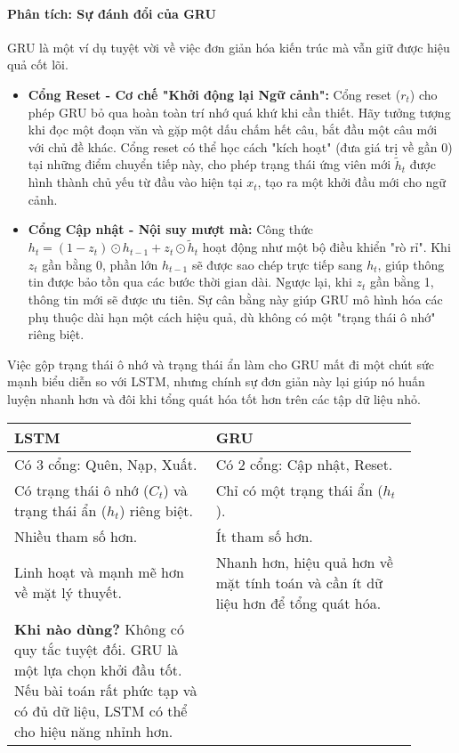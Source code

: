 \paragraph{Phân tích: Sự đánh đổi của GRU}
GRU là một ví dụ tuyệt vời về việc đơn giản hóa kiến trúc mà vẫn giữ được hiệu quả cốt lõi.
\begin{itemize}
    \item \textbf{Cổng Reset - Cơ chế "Khởi động lại Ngữ cảnh":} Cổng reset ($r_t$) cho phép GRU bỏ qua hoàn toàn trí nhớ quá khứ khi cần thiết. Hãy tưởng tượng khi đọc một đoạn văn và gặp một dấu chấm hết câu, bắt đầu một câu mới với chủ đề khác. Cổng reset có thể học cách "kích hoạt" (đưa giá trị về gần 0) tại những điểm chuyển tiếp này, cho phép trạng thái ứng viên mới $\tilde{h}_t$ được hình thành chủ yếu từ đầu vào hiện tại $x_t$, tạo ra một khởi đầu mới cho ngữ cảnh.
    
    \item \textbf{Cổng Cập nhật - Nội suy mượt mà:} Công thức $h_t = (1 - z_t) \odot h_{t-1} + z_t \odot \tilde{h}_t$ hoạt động như một bộ điều khiển "rò rỉ". Khi $z_t$ gần bằng 0, phần lớn $h_{t-1}$ sẽ được sao chép trực tiếp sang $h_t$, giúp thông tin được bảo tồn qua các bước thời gian dài. Ngược lại, khi $z_t$ gần bằng 1, thông tin mới sẽ được ưu tiên. Sự cân bằng này giúp GRU mô hình hóa các phụ thuộc dài hạn một cách hiệu quả, dù không có một "trạng thái ô nhớ" riêng biệt.
\end{itemize}
Việc gộp trạng thái ô nhớ và trạng thái ẩn làm cho GRU mất đi một chút sức mạnh biểu diễn so với LSTM, nhưng chính sự đơn giản này lại giúp nó huấn luyện nhanh hơn và đôi khi tổng quát hóa tốt hơn trên các tập dữ liệu nhỏ.
\begin{tcolorbox}[
    title=So sánh LSTM và GRU,
    colback=green!5!white, colframe=green!60!black, fonttitle=\bfseries
]
\begin{tabular}{p{0.45\linewidth} | p{0.45\linewidth}}
    \textbf{LSTM} & \textbf{GRU} \\
    \hline
    Có 3 cổng: Quên, Nạp, Xuất. & Có 2 cổng: Cập nhật, Reset. \\
    \hline
    Có trạng thái ô nhớ ($C_t$) và trạng thái ẩn ($h_t$) riêng biệt. & Chỉ có một trạng thái ẩn ($h_t$). \\
    \hline
    Nhiều tham số hơn. & Ít tham số hơn. \\
    \hline
    Linh hoạt và mạnh mẽ hơn về mặt lý thuyết. & Nhanh hơn, hiệu quả hơn về mặt tính toán và cần ít dữ liệu hơn để tổng quát hóa. \\
    \hline
    \textbf{Khi nào dùng?} Không có quy tắc tuyệt đối. GRU là một lựa chọn khởi đầu tốt. Nếu bài toán rất phức tạp và có đủ dữ liệu, LSTM có thể cho hiệu năng nhỉnh hơn.
\end{tabular}
\end{tcolorbox}